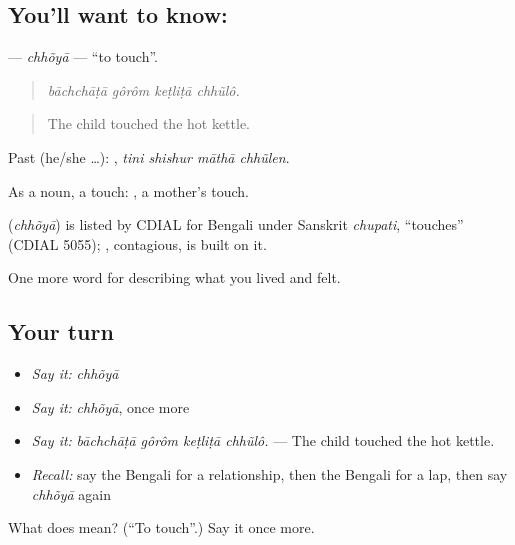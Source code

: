 \subsection*{You'll want to know: }
\textbf{} — \emph{chhõyā} — \textquotedblleft{}to touch\textquotedblright{}.

\begin{quote}
   
\end{quote}

\begin{quote}
\emph{bāchchāṭā gôrôm keṭliṭā chhũlô.}
\end{quote}

\begin{quote}
The child touched the hot kettle.
\end{quote}

Past (he/she …):    , \emph{tini shishur māthā chhũlen}.

As a noun, a touch:  , a mother's touch.

\begin{cousinweb}
\textbf{} (\emph{chhõyā}) is listed by CDIAL for Bengali under Sanskrit \emph{chupati}, \textquotedblleft{}touches\textquotedblright{} (CDIAL 5055); , contagious, is built on it.
\end{cousinweb}

\begin{grammarlens}[title={What you've built}]
One more word for describing what you lived and felt.
\end{grammarlens}

\subsection*{Your turn}
\begin{itemize}
\raggedright
  \item \emph{Say it:} \emph{chhõyā}
  \item \emph{Say it:} \emph{chhõyā}, once more
  \item \emph{Say it:} \emph{bāchchāṭā gôrôm keṭliṭā chhũlô.} — The child touched the hot kettle.
  \item \emph{Recall:} say the Bengali for a relationship, then the Bengali for a lap, then say \emph{chhõyā} again
\end{itemize}

\begin{tcolorbox}[breakable,colback=teal!4,colframe=teal!35!black,title={Before you move on}]
What does  mean? (\textquotedblleft{}To touch\textquotedblright{}.) Say it once more.
\end{tcolorbox}
